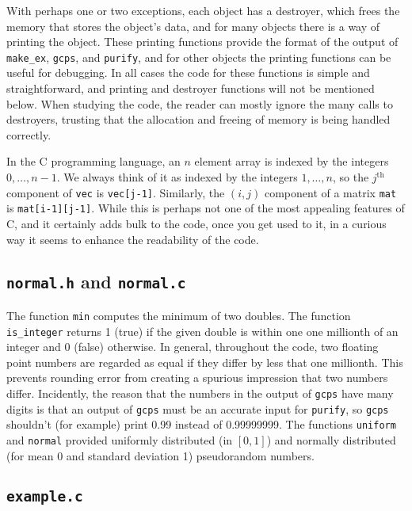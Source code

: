 \documentclass[12pt]{article}
\theoremstyle{definition}
\begin{document}
\begin{appendix}
With perhaps one or two exceptions, each object has a destroyer, which
frees the memory that stores the object's data, and for many objects
there is a way of printing the object.  These printing functions
provide the format of the output of \texttt{make\_ex}, \texttt{gcps},
and \texttt{purify}, and for other objects the printing functions can
be useful for debugging.  In all cases the code for these functions is
simple and straightforward, and printing and destroyer functions will
not be mentioned below.  When studying the code, the reader can mostly
ignore the many calls to destroyers, trusting that the allocation and
freeing of memory is being handled correctly.

In the C programming language, an $n$ element array is indexed by the
integers $0, \ldots, n-1$.  We always think of it as indexed by the
integers $1, \ldots, n$, so the $j^{\text{th}}$ component of
\texttt{vec} is \texttt{vec[j-1]}.  Similarly, the $(i,j)$ component
of a matrix \texttt{mat} is \texttt{mat[i-1][j-1]}.  While this is
perhaps not one of the most appealing features of C, and it certainly
adds bulk to the code, once you get used to it, in a curious way it
seems to enhance the readability of the code.

\subsection{\texttt{normal.h} and \texttt{normal.c}}

The function \texttt{min} computes the minimum of two doubles.  The
function \texttt{is\_integer} returns 1 (true) if the given double is
within one one millionth of an integer and 0 (false) otherwise.  In
general, throughout the code, two floating point numbers are regarded
as equal if they differ by less that one millionth.  This prevents
rounding error from creating a spurious impression that two numbers
differ.  Incidently, the reason that the numbers in the output of
\texttt{gcps} have many digits is that an output of \texttt{gcps} must
be an accurate input for \texttt{purify}, so \texttt{gcps} shouldn't
(for example) print 0.99 instead of 0.99999999. The functions
\texttt{uniform} and \texttt{normal} provided uniformly distributed
(in $[0,1]$) and normally distributed (for mean 0 and standard
deviation 1) pseudorandom numbers.

\subsection{\texttt{example.c}}


\end{appendix}
\end{document}
